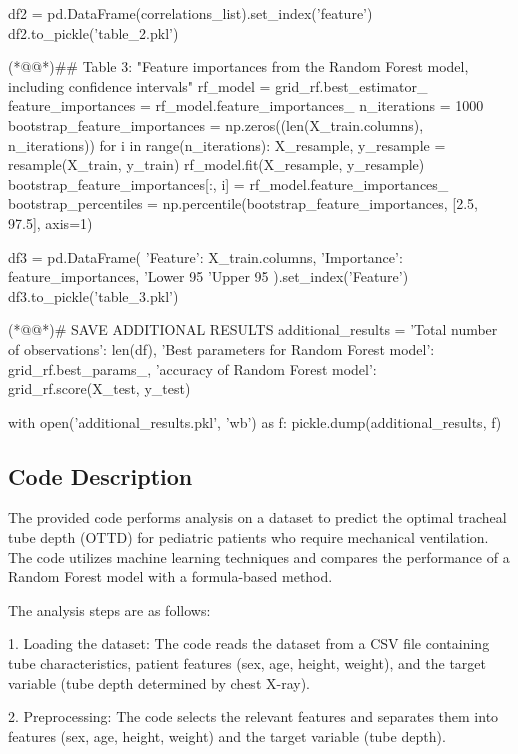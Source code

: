 \documentclass[11pt]{article}
\begin{document}
\begin{python}
df2 = pd.DataFrame(correlations_list).set_index('feature')
df2.to_pickle('table_2.pkl')

(*@@*)## Table 3: "Feature importances from the Random Forest model, including confidence intervals"
rf_model = grid_rf.best_estimator_
feature_importances = rf_model.feature_importances_
n_iterations = 1000
bootstrap_feature_importances = np.zeros((len(X_train.columns), n_iterations))
for i in range(n_iterations):
    X_resample, y_resample = resample(X_train, y_train)
    rf_model.fit(X_resample, y_resample)
    bootstrap_feature_importances[:, i] = rf_model.feature_importances_
bootstrap_percentiles = np.percentile(bootstrap_feature_importances, [2.5, 97.5], axis=1)

df3 = pd.DataFrame({
    'Feature': X_train.columns,
    'Importance': feature_importances,
    'Lower 95%
    'Upper 95%
}).set_index('Feature')
df3.to_pickle('table_3.pkl')

(*@@*)# SAVE ADDITIONAL RESULTS
additional_results = {
    'Total number of observations': len(df),
    'Best parameters for Random Forest model': grid_rf.best_params_,         
    'accuracy of Random Forest model': grid_rf.score(X_test, y_test)
}

with open('additional_results.pkl', 'wb') as f:
    pickle.dump(additional_results, f)

\end{python}

\subsection{Code Description}

The provided code performs analysis on a dataset to predict the optimal tracheal tube depth (OTTD) for pediatric patients who require mechanical ventilation. The code utilizes machine learning techniques and compares the performance of a Random Forest model with a formula-based method.

The analysis steps are as follows:

1. Loading the dataset: The code reads the dataset from a CSV file containing tube characteristics, patient features (sex, age, height, weight), and the target variable (tube depth determined by chest X-ray).

2. Preprocessing: The code selects the relevant features and separates them into features (sex, age, height, weight) and the target variable (tube depth).
\end{document}
